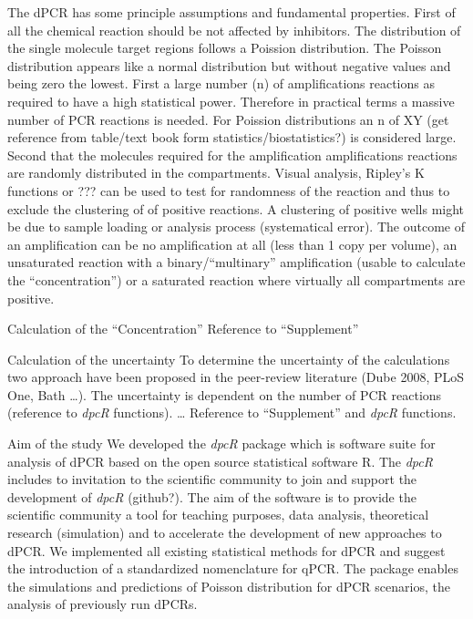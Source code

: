 \documentclass{bioinfo}
\begin{document}
The dPCR has some principle assumptions and fundamental properties. First of all the chemical reaction should be not affected by inhibitors. The distribution of the single molecule target regions follows a Poission distribution. The Poisson distribution appears like a normal distribution but without negative values and being zero the lowest. First a large number (n) of amplifications reactions as required to have a high statistical power. Therefore in practical terms a massive number of PCR reactions is needed. For Poission distributions an n of XY (get reference from table/text book form statistics/biostatistics?) is considered large. Second that the molecules required for the amplification amplifications reactions are randomly distributed in the compartments. Visual analysis, Ripley's K functions or ??? can be used to test for randomness of the reaction and thus to exclude the clustering of of positive reactions. A clustering of positive wells might be due to sample loading or analysis process (systematical error). The outcome of an amplification can be no amplification at all (less than 1 copy per volume), an unsaturated reaction with a binary/``multinary'' amplification (usable to calculate the ``concentration'') or a saturated reaction where virtually all compartments are positive.

Calculation of the ``Concentration''
Reference to ``Supplement''

Calculation of the uncertainty
To determine the uncertainty of the calculations two approach have been proposed in the peer-review literature (Dube 2008, PLoS One, Bath …). The uncertainty is dependent on the number of PCR reactions (reference to \textit{\textit{dpcR}} functions). … Reference to ``Supplement'' and \textit{dpcR} functions.

Aim of the study
We developed the \textit{dpcR} package which is software suite for analysis of dPCR based on the open source statistical software R. The \textit{dpcR} includes to invitation to the scientific community to join and support the development of \textit{dpcR} (github?). The aim of the software is to provide the scientific community a tool for teaching purposes, data analysis, theoretical research (simulation) and to accelerate the development of new approaches to dPCR. We implemented all existing statistical methods for dPCR and suggest the introduction of a standardized nomenclature for qPCR. The package enables the simulations and predictions of Poisson distribution for dPCR scenarios, the analysis of previously run dPCRs.
\end{document}
